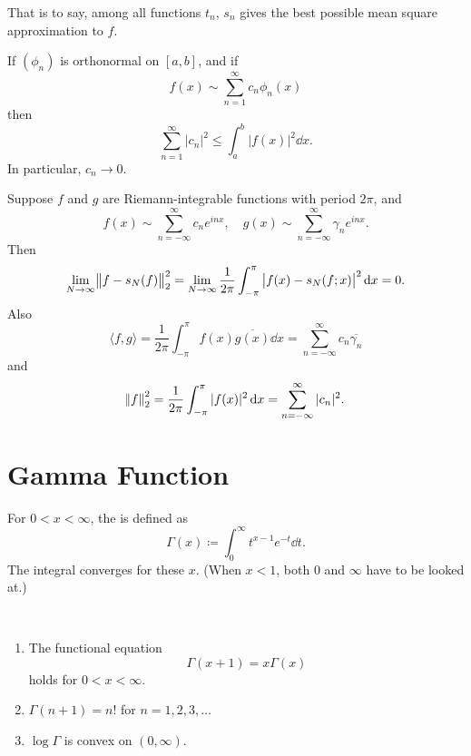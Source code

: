 That is to say, among all functions $t_n$, $s_n$ gives the best possible mean square approximation to $f$.

\begin{proposition}
If $(\phi_n)$ is orthonormal on $[a,b]$, and if
\[f(x)\sim\sum_{n=1}^{\infty}c_n\phi_n(x)\]
then
\begin{equation}
\sum_{n=1}^{\infty}|c_n|^2\le\int_{a}^{b}|f(x)|^2\dd{x}.
\end{equation}
In particular, $c_n\to0$.
\end{proposition}

\begin{theorem}
Suppose $f$ and $g$ are Riemann-integrable functions with period $2\pi$, and 
\[f(x)\sim\sum_{n=-\infty}^{\infty}c_ne^{inx},\quad g(x)\sim\sum_{n=-\infty}^{\infty}\gamma_ne^{inx}.\]
Then
\[\lim_{N\to\infty}\norm{f-s_N(f)}_2^2=\lim_{N\to\infty}\frac{1}{2\pi}\int_{-\pi}^{\pi}\left|f(x)-s_N(f;x)\right|^2\dd{x}=0.\]
Also
\[\langle f,g\rangle=\frac{1}{2\pi}\int_{-\pi}^{\pi}f(x)\overline{g(x)}\dd{x}=\sum_{n=-\infty}^{\infty}c_n\overline{\gamma_n}\]
and
\[\norm{f}_2^2=\frac{1}{2\pi}\int_{-\pi}^{\pi}|f(x)|^2\dd{x}=\sum_{n=-\infty}^{\infty}|c_n|^2.\]
\end{theorem}
\pagebreak

\section{Gamma Function}
\begin{definition}
For $0<x<\infty$, the  is defined as
\begin{equation}
\Gamma(x)\coloneqq\int_0^\infty t^{x-1}e^{-t}\dd{t}.
\end{equation}
The integral converges for these $x$. (When $x<1$, both $0$ and $\infty$ have to be looked at.)
\end{definition}

\begin{lemma} \
\begin{enumerate}[label=(\roman*)]
\item The functional equation
\[\Gamma(x+1)=x\Gamma(x)\]
holds for $0<x<\infty$.
\item $\Gamma(n+1)=n!$ for $n=1,2,3,\dots$
\item $\log\Gamma$ is convex on $(0,\infty)$.
\end{enumerate}
\end{lemma}

